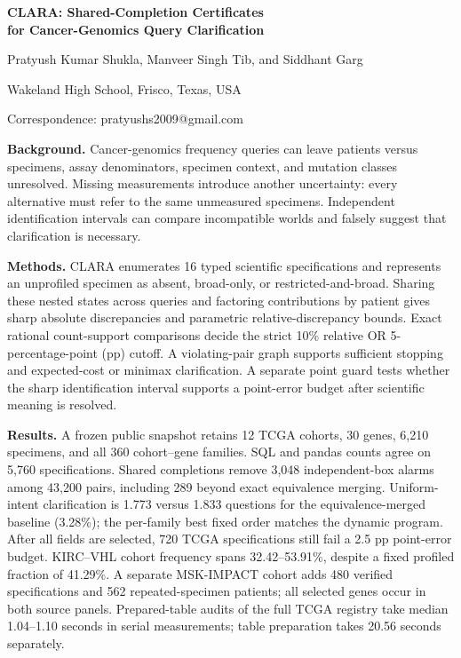 \documentclass[11pt,letterpaper]{article}
\begin{document}
\begin{center}
{\Large\bfseries CLARA: Shared-Completion Certificates\\for Cancer-Genomics Query Clarification}\par\medskip
Pratyush Kumar Shukla, Manveer Singh Tib, and Siddhant Garg\par
Wakeland High School, Frisco, Texas, USA\par
Correspondence: pratyushs2009@gmail.com
\end{center}
\medskip
\noindent\textbf{Background.} Cancer-genomics frequency queries can leave patients versus specimens, assay denominators, specimen context, and mutation classes unresolved. Missing measurements introduce another uncertainty: every alternative must refer to the same unmeasured specimens. Independent identification intervals can compare incompatible worlds and falsely suggest that clarification is necessary.

\medskip\noindent\textbf{Methods.} CLARA enumerates 16 typed scientific specifications and represents an unprofiled specimen as absent, broad-only, or restricted-and-broad. Sharing these nested states across queries and factoring contributions by patient gives sharp absolute discrepancies and parametric relative-discrepancy bounds. Exact rational count-support comparisons decide the strict 10\% relative OR 5-percentage-point (pp) cutoff. A violating-pair graph supports sufficient stopping and expected-cost or minimax clarification. A separate point guard tests whether the sharp identification interval supports a point-error budget after scientific meaning is resolved.

\medskip\noindent\textbf{Results.} A frozen public snapshot retains 12 TCGA cohorts, 30 genes, 6,210 specimens, and all 360 cohort--gene families. SQL and pandas counts agree on 5,760 specifications. Shared completions remove 3,048 independent-box alarms among 43,200 pairs, including 289 beyond exact equivalence merging. Uniform-intent clarification is 1.773 versus 1.833 questions for the equivalence-merged baseline (3.28\%); the per-family best fixed order matches the dynamic program. After all fields are selected, 720 TCGA specifications still fail a 2.5 pp point-error budget. KIRC--VHL cohort frequency spans 32.42--53.91\%, despite a fixed profiled fraction of 41.29\%. A separate MSK-IMPACT cohort adds 480 verified specifications and 562 repeated-specimen patients; all selected genes occur in both source panels. Prepared-table audits of the full TCGA registry take median 1.04--1.10 seconds in serial measurements; table preparation takes 20.56 seconds separately.
\end{document}
